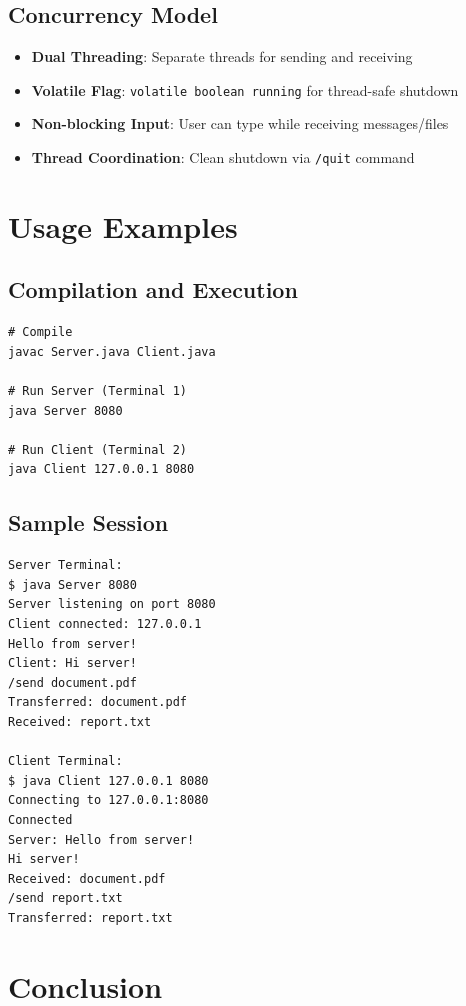 \documentclass[12pt, letterpaper]{article}
\begin{document}
\subsection{Concurrency Model}
\begin{itemize}
    \item \textbf{Dual Threading}: Separate threads for sending and receiving
    \item \textbf{Volatile Flag}: \texttt{volatile boolean running} for thread-safe shutdown
    \item \textbf{Non-blocking Input}: User can type while receiving messages/files
    \item \textbf{Thread Coordination}: Clean shutdown via \texttt{/quit} command
\end{itemize}

\section{Usage Examples}

\subsection{Compilation and Execution}
\begin{verbatim}
# Compile
javac Server.java Client.java

# Run Server (Terminal 1)
java Server 8080

# Run Client (Terminal 2)
java Client 127.0.0.1 8080
\end{verbatim}

\subsection{Sample Session}
\begin{verbatim}
Server Terminal:
$ java Server 8080
Server listening on port 8080
Client connected: 127.0.0.1
Hello from server!
Client: Hi server!
/send document.pdf
Transferred: document.pdf
Received: report.txt

Client Terminal:
$ java Client 127.0.0.1 8080
Connecting to 127.0.0.1:8080
Connected
Server: Hello from server!
Hi server!
Received: document.pdf
/send report.txt
Transferred: report.txt
\end{verbatim}

\section{Conclusion}
\end{document}
